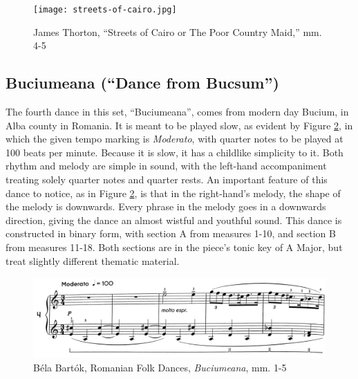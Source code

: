 \begin{figure}
  \centering
  \texttt{[image: streets-of-cairo.jpg]}
  \caption{James Thorton, ``Streets of Cairo or The Poor Country Maid,'' mm. 4-5}
  \label{fig:thorton-streets-of-cairo}
\end{figure}



\subsection{Buciumeana (``Dance from Bucsum'')}

The fourth dance in this set, ``Buciumeana'', comes from modern day Bucium, in Alba county in Romania. It is meant to be played slow, as evident by Figure \ref{fig:bartok-dance-four-first-line}\autocite{Lung_2016}, in which the given tempo marking is \textit{Moderato}, with quarter notes to be played at 100 beats per minute. Because it is slow, it has a childlike simplicity to it. Both rhythm and melody are simple in sound, with the left-hand accompaniment treating solely quarter notes and quarter rests. An important feature of this dance to notice, as in Figure \ref{fig:bartok-dance-four-first-line}\autocite{Lung_2016}, is that in the right-hand's melody, the shape of the melody is downwards. Every phrase in the melody goes in a downwards direction, giving the dance an almost wistful and youthful sound. This dance is constructed in binary form, with section A from measures 1-10, and section B from measures 11-18. Both sections are in the piece's tonic key of A Major, but treat slightly different thematic material. 

\begin{figure}[h]
  \centering
  \includegraphics[width=\textwidth]{figures/bartok-dance-four-first-line.jpg}
  \caption{Béla Bartók, Romanian Folk Dances, \textit{Buciumeana}, mm. 1-5}
  \label{fig:bartok-dance-four-first-line}
\end{figure}

